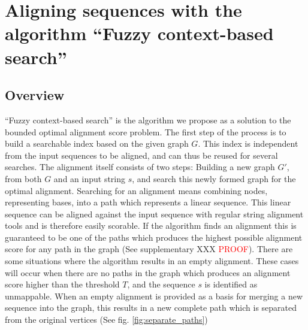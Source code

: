 \documentclass{article}
\begin{document}
\section{Aligning sequences with the algorithm ``Fuzzy context-based search''}
\subsection{Overview}
``Fuzzy context-based search'' is the algorithm we propose as a solution to the bounded optimal alignment score problem. The first step of the process is to build a searchable index based on the given graph $G$. This index is independent from the input sequences to be aligned, and can thus be reused for several searches. The alignment itself consists of two steps: Building a new graph $G'$, from both $G$ and an input string $s$, and search this newly formed graph for the optimal alignment. Searching for an alignment means combining nodes, representing bases, into a path which represents a linear sequence. This linear sequence can be aligned against the input sequence with regular string alignment tools and is therefore easily scorable. If the algorithm finds an alignment this is guaranteed to be one of the paths which produces the highest possible alignment score for any path in the graph (See supplementary XXX \textcolor{red}{PROOF}). There are some situations where the algorithm results in an empty alignment. These cases will occur when there are no paths in the graph which produces an alignment score higher than the threshold $T$, and the sequence $s$ is identified as unmappable. When an empty alignment is provided as a basis for merging a new sequence into the graph, this results in a new complete path which is separated from the original vertices (See fig. \ref{fig:separate_paths})
\end{document}
